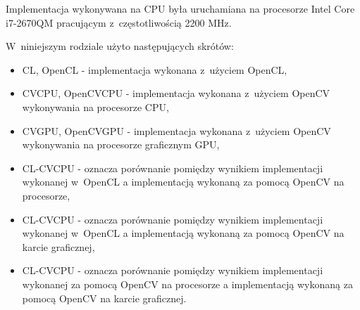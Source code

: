 Implementacja wykonywana na CPU była uruchamiana na procesorze Intel Core i7-2670QM pracującym z~częstotliwością 2200 MHz.

W~niniejszym rodziale użyto następujących skrótów:
\begin{itemize}
\item CL, OpenCL - implementacja wykonana z~użyciem OpenCL,
\item CVCPU, OpenCVCPU - implementacja wykonana z~użyciem OpenCV wykonywania na procesorze CPU,
\item CVGPU, OpenCVGPU - implementacja wykonana z~użyciem OpenCV wykonywania na procesorze graficznym GPU,
\item CL-CVCPU - oznacza porównanie pomiędzy wynikiem implementacji wykonanej w~OpenCL a implementacją wykonaną za pomocą OpenCV na procesorze,
\item CL-CVCPU - oznacza porównanie pomiędzy wynikiem implementacji wykonanej w~OpenCL a implementacją wykonaną za pomocą OpenCV na karcie graficznej,
\item CL-CVCPU - oznacza porównanie pomiędzy wynikiem implementacji wykonanej za pomocą OpenCV na procesorze a implementacją wykonaną za pomocą OpenCV na karcie graficznej.
\end{itemize}

